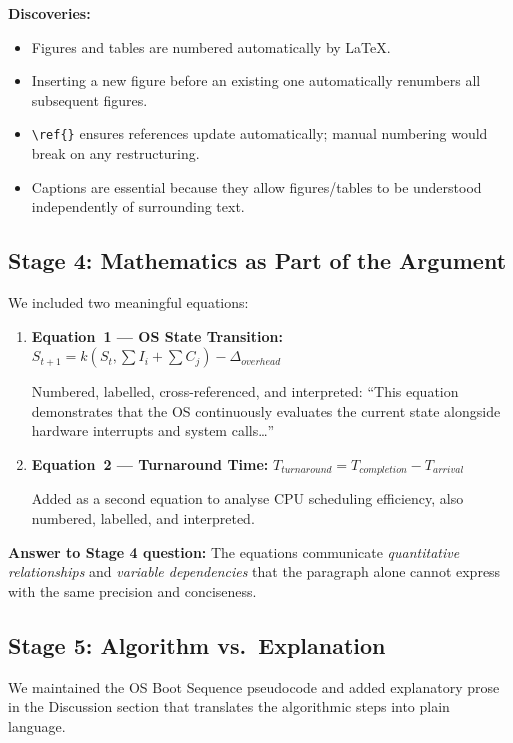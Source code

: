 \documentclass[11pt, a4paper]{article}
\begin{document}
\noindent\textbf{Discoveries:}
\begin{itemize}[nosep]
    \item Figures and tables are numbered automatically by \LaTeX.
    \item Inserting a new figure before an existing one automatically renumbers all subsequent figures.
    \item \texttt{\textbackslash ref\{\}} ensures references update automatically; manual numbering would break on any restructuring.
    \item Captions are essential because they allow figures/tables to be understood independently of surrounding text.
\end{itemize}

\subsection{Stage 4: Mathematics as Part of the Argument}
We included two meaningful equations:
\begin{enumerate}[nosep]
    \item \textbf{Equation~1 --- OS State Transition:} $S_{t+1} = k\left(S_t, \sum I_i + \sum C_j\right) - \Delta_{overhead}$
    
    Numbered, labelled, cross-referenced, and interpreted: ``This equation demonstrates that the OS continuously evaluates the current state alongside hardware interrupts and system calls\ldots''
    
    \item \textbf{Equation~2 --- Turnaround Time:} $T_{turnaround} = T_{completion} - T_{arrival}$
    
    Added as a second equation to analyse CPU scheduling efficiency, also numbered, labelled, and interpreted.
\end{enumerate}

\noindent\textbf{Answer to Stage 4 question:} The equations communicate \emph{quantitative relationships} and \emph{variable dependencies} that the paragraph alone cannot express with the same precision and conciseness.

\subsection{Stage 5: Algorithm vs.\ Explanation}
We maintained the OS Boot Sequence pseudocode and added explanatory prose in the Discussion section that translates the algorithmic steps into plain language.
\end{document}
